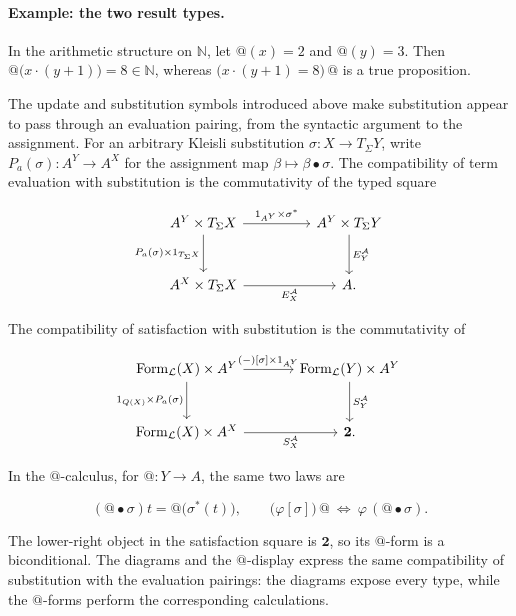 \documentclass[11pt]{article}
\makeatletter
\newcommand{\atsign}{\mathord{@}}
\theoremstyle{definition}
\makeatother
\begin{document}
\paragraph{Example: the two result types.}
In the arithmetic structure on \(\mathbb N\), let \(\atsign(x)=2\) and
\(\atsign(y)=3\). Then \(\atsign\bigl(x\cdot(y+1)\bigr)=8\in\mathbb N\),
whereas \(\bigl(x\cdot(y+1)=8\bigr)\,\atsign\) is a true proposition.

The update and substitution symbols introduced above make substitution appear
to pass through an evaluation pairing, from the syntactic argument to the
assignment. For an arbitrary Kleisli substitution
$\sigma:X\to T_\Sigma Y$, write
$P_a(\sigma):A^Y\to A^X$ for the assignment map
$\beta\mapsto\beta\bullet\sigma$. The compatibility of term evaluation with
substitution is the commutativity of the typed square

\[
\begin{tikzcd}[row sep=large,column sep=huge]
A^Y\times T_\Sigma X
  \arrow[r,"1_{A^Y}\times\sigma^*"]
  \arrow[d,"P_a(\sigma)\times1_{T_\Sigma X}"'] &
A^Y\times T_\Sigma Y \arrow[d,"E_Y^{\mathcal A}"] \\
A^X\times T_\Sigma X \arrow[r,"E_X^{\mathcal A}"'] & A.
\end{tikzcd}
\]

The compatibility of satisfaction with substitution is the commutativity of

\[
\begin{tikzcd}[row sep=large,column sep=large]
\operatorname{Form}_{\mathcal L}(X)\times A^Y
  \arrow[r,"{(-)[\sigma]\times1_{A^Y}}"]
  \arrow[d,"1_{Q(X)}\times P_a(\sigma)"'] &
\operatorname{Form}_{\mathcal L}(Y)\times A^Y
  \arrow[d,"S_Y^{\mathcal A}"] \\
\operatorname{Form}_{\mathcal L}(X)\times A^X
  \arrow[r,"S_X^{\mathcal A}"'] & \mathbf 2.
\end{tikzcd}
\]

In the $\atsign$-calculus, for \(\atsign:Y\to A\), the same two laws are

\[
(\atsign\bullet\sigma)t
=\atsign\bigl(\sigma^*(t)\bigr),
\qquad
\bigl(\varphi[\sigma]\bigr)\,\atsign
\ \Longleftrightarrow\ 
\varphi\,(\atsign\bullet\sigma).
\]

The lower-right object in the satisfaction square is \(\mathbf 2\), so its
$\atsign$-form is a biconditional. The diagrams and the $\atsign$-display
express the same compatibility of substitution with the evaluation pairings:
the diagrams expose every type, while the $\atsign$-forms perform the
corresponding calculations.
\end{document}
